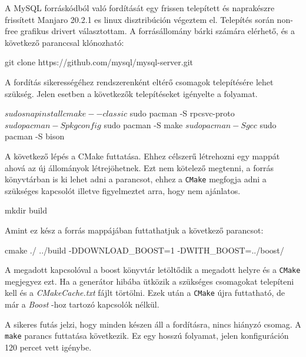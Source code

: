 

A MySQL forráskódból való fordítását egy frissen telepített és naprakészre frissített Manjaro 20.2.1 es linux disztribúción végeztem el. Telepítés során non-free grafikus drivert választottam.
A forrásállomány bárki számára elérhető, és a következő paranccsal klónozható:
\begin{python}
 git clone https://github.com/mysql/mysql-server.git
\end{python}
A fordítás sikerességéhez rendszerenként eltérő csomagok telepítésére lehet szükség. Jelen esetben a következők telepítéseket igényelte a folyamat.
\begin{python}
 $ sudo snap install cmake --classic
 $ sudo pacman -S rpcsvc-proto
 $ sudo pacman -S pkgconfig
 $ sudo pacman -S make
 $ sudo pacman -S gcc
 $ sudo pacman -S bison
\end{python}%
A következő lépés a CMake futtatása. Ehhez célszerű létrehozni egy mappát ahová az új állományok létrejöhetnek. Ezt nem kötelező megtenni, a forrás könyvtárban is ki lehet adni a parancsot, ehhez a \texttt{CMake} megfogja adni a szükséges kapcsolót illetve figyelmeztet arra, hogy nem ajánlatos.
\begin{python}
 mkdir build
\end{python}
Amint ez kész a forrás mappájában futtathatjuk a következő parancsot:
\begin{python}
 cmake ./ ../build -DDOWNLOAD_BOOST=1 -DWITH_BOOST=../boost/
\end{python}
A megadott kapcsolóval a boost könyvtár letöltődik a megadott helyre és a \texttt{CMake} megjegyez ezt. Ha a generátor hibába ütközik a szükséges csomagokat telepíteni kell és a \textit{CMakeCache.txt} fájlt törtölni. Ezek után a \texttt{CMake} újra futtatható, de már a \textit{Boost} -hoz tartozó kapcsolók nélkül.

A sikeres futás jelzi, hogy minden készen áll a fordításra, nincs hiányzó csomag.
A \texttt{make} parancs futtatása következik. Ez egy hosszú folyamat, jelen konfiguráción 120 percet vett igénybe. 

